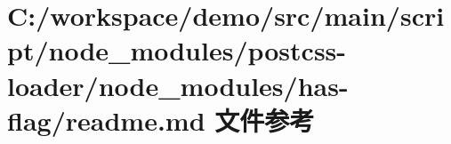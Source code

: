 \hypertarget{node__modules_2postcss-loader_2node__modules_2has-flag_2_r_e_a_d_m_e_8md}{}\section{C\+:/workspace/demo/src/main/script/node\+\_\+modules/postcss-\/loader/node\+\_\+modules/has-\/flag/readme.md 文件参考}
\label{node__modules_2postcss-loader_2node__modules_2has-flag_2_r_e_a_d_m_e_8md}
